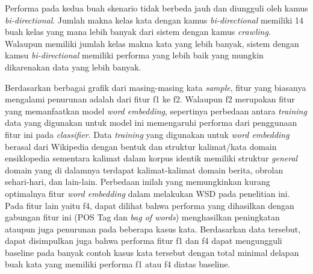 Performa pada kedua buah skenario tidak berbeda jauh dan diungguli oleh kamus \textit{bi-directional}. Jumlah makna kelas kata dengan kamus \textit{bi-directional} memiliki 14 buah kelas yang mana lebih banyak dari sistem dengan kamus \textit{crawling}. Walaupun memiliki jumlah kelas makna kata yang lebih banyak, sistem dengan kamsu \textit{bi-directional} memiliki performa yang lebih baik yang mungkin dikarenakan data yang lebih banyak.

Berdasarkan berbagai grafik dari masing-masing kata \textit{sample}, fitur yang biasanya mengalami penurunan adalah dari fitur f1 ke f2. Walaupun f2 merupakan fitur yang memanfaatkan model \textit{word embedding}, sepertinya perbedaan antara \textit{training} data yang digunakan untuk model ini memengaruhi performa dari penggunaan fitur ini pada \textit{classifier}. Data \textit{training} yang digunakan untuk \textit{word embedding} berasal dari Wikipedia dengan bentuk dan struktur kalimat/kata domain ensiklopedia sementara kalimat dalam korpus identik memiliki struktur \textit{general} domain yang di dalamnya terdapat kalimat-kalimat domain berita, obrolan sehari-hari, dan lain-lain. Perbedaan inilah yang memungkinkan kurang optimalnya fitur \textit{word embedding} dalam melakukan WSD pada penelitian ini. Pada fitur lain yaitu f4, dapat dilihat bahwa performa yang dihasilkan dengan gabungan fitur ini (POS Tag dan \textit{bag of words}) menghasilkan peningkatan ataupun juga penurunan pada beberapa kasus kata. Berdasarkan data tersebut, dapat disimpulkan juga bahwa performa fitur f1 dan f4 dapat mengungguli baseline pada banyak contoh kasus kata tersebut dengan total minimal delapan buah kata yang memiliki performa f1 atau f4 diatas baseline.